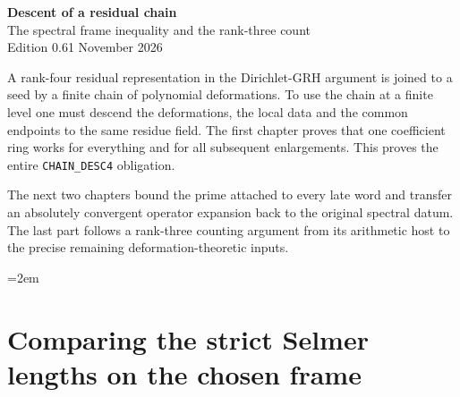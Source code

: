 \begin{center}
{\Large\bfseries Descent of a residual chain}\\[4pt]
{\large The spectral frame inequality and the rank-three count}\\[4pt]
Edition 0.61  November 2026
\end{center}

A rank-four residual representation in the Dirichlet-GRH argument is
joined to a seed by a finite chain of polynomial deformations.
To use the chain at a finite level one must descend the deformations,
the local data and the common endpoints to the same residue field.
The first chapter proves that one coefficient ring works for everything
and for all subsequent enlargements. This proves the entire
\texttt{CHAIN\_DESC4} obligation.

The next two chapters bound the prime attached to every late word
and transfer an absolutely convergent operator expansion back to the
original spectral datum. The last part follows a rank-three counting
argument from its arithmetic host to the precise remaining
deformation-theoretic inputs.

\begingroup\emergencystretch=2em



\section{Comparing the strict Selmer lengths on the chosen frame}


\endgroup
